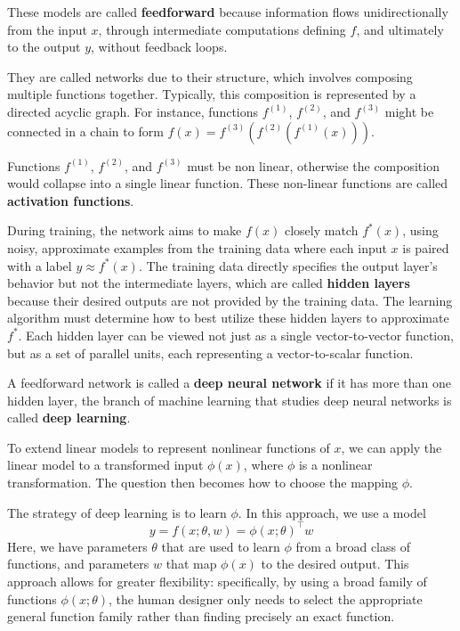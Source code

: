 These models are called \textbf{feedforward} because information
flows unidirectionally from the input \( x \), through intermediate computations
defining \( f \), and ultimately to the output \( y \), without feedback loops.

They are called networks due to their structure, which involves composing
multiple functions together. Typically, this composition is represented
by a directed acyclic graph. For instance, functions
\( f^{(1)} \), \( f^{(2)} \), and \( f^{(3)} \) might be connected in
a chain to form \( f(x) = f^{(3)}(f^{(2)}(f^{(1)}(x))) \).

Functions \( f^{(1)} \), \( f^{(2)} \), and \( f^{(3)} \) must
be non linear, otherwise the composition would collapse into a single
linear function. These non-linear functions are
called \textbf{activation functions}.

During training, the network aims to make \( f(x) \) closely match \( f^*(x) \),
using noisy, approximate examples from the training data where each input
\( x \) is paired with a label \( y \approx f^*(x) \).
The training data directly specifies the output layer's behavior but
not the intermediate layers, which are called \textbf{hidden layers}
because their desired outputs are not provided by the training data.
The learning algorithm must determine how to best utilize these
hidden layers to approximate \( f^* \). Each hidden layer can be viewed
not just as a single vector-to-vector function, but as a set of parallel units,
each representing a vector-to-scalar function.

A feedforward network is called a \textbf{deep neural network} if it has
more than one hidden layer, the branch of machine learning that studies
deep neural networks is called \textbf{deep learning}.

To extend linear models to represent nonlinear functions of \( x \),
we can apply the linear model to a transformed
input \( \phi(x) \), where \( \phi \) is a nonlinear transformation.
The question then becomes how to choose the mapping \( \phi \).

The strategy of deep learning is to learn \( \phi \).
In this approach, we use a model
\[ y = f(x; \theta, w) = \phi(x; \theta)^\top w \]
Here, we have parameters \( \theta \) that are used to learn \( \phi \)
from a broad class of functions, and parameters \( w \) that map \( \phi(x) \)
to the desired output.
This approach allows for greater flexibility:
specifically, by using a broad family of functions
\( \phi(x; \theta) \), the human designer only needs to select the appropriate
general function family rather than finding precisely an exact function.

